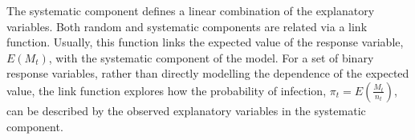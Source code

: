 %
The systematic component defines a linear combination of the explanatory variables.
Both random and systematic components are related via a link function.
Usually, this function links the expected value of the response variable, $E(M_t)$, with the systematic component of the model.
For a set of binary response variables, rather than directly modelling the dependence of the expected value, the link function explores how the probability of infection, $\pi_t=E(\frac{M_t}{n_t})$, can be described by the observed explanatory variables in the systematic component.
